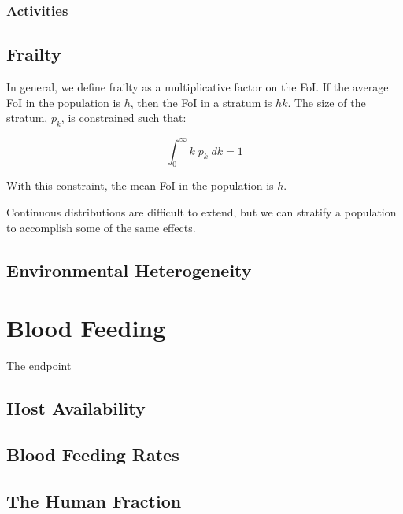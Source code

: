 \documentclass[
]{book}
\begin{document}
\hypertarget{activities}{%
\subsection{Activities}\label{activities}}

\hypertarget{frailtyCh}{%
\section{Frailty}\label{frailtyCh}}

In general, we define frailty as a multiplicative factor on the FoI. If the average FoI in the population is \(h\), then the FoI in a stratum is \(hk\). The size of the stratum, \(p_k\), is constrained such that:

\[\int_0^\infty k \; p_k \; dk = 1\]

With this constraint, the mean FoI in the population is \(h\).

Continuous distributions are difficult to extend, but we can stratify a population to accomplish some of the same effects.

\hypertarget{environmentalHeterogeneity}{%
\section{Environmental Heterogeneity}\label{environmentalHeterogeneity}}

\hypertarget{blood-feeding-1}{%
\chapter{Blood Feeding}\label{blood-feeding-1}}

The endpoint

\hypertarget{host-availability}{%
\section{Host Availability}\label{host-availability}}

\hypertarget{blood-feeding-rates}{%
\section{Blood Feeding Rates}\label{blood-feeding-rates}}

\hypertarget{the-human-fraction}{%
\section{The Human Fraction}\label{the-human-fraction}}
\end{document}
